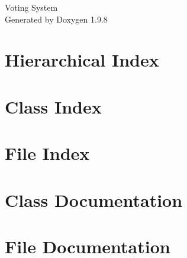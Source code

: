 \documentclass[twoside]{book}
\newcommand{\+}{\discretionary{\mbox{\scriptsize$\hookleftarrow$}}{}{}}
\newcommand{\clearemptydoublepage}{%
    \newpage{\pagestyle{empty}\cleardoublepage}%
  }
\begin{document}
  \raggedbottom
    \hypersetup{pageanchor=false,
                bookmarksnumbered=true,
                pdfencoding=unicode
               }
  \begin{titlepage}
  \vspace*{7cm}
  \begin{center}%
  {\Large Voting System}\\
  \vspace*{1cm}
  {\large Generated by Doxygen 1.9.8}\\
  \end{center}
  \end{titlepage}
  \clearemptydoublepage
  \tableofcontents
  \clearemptydoublepage
  \hypersetup{pageanchor=true}
\chapter{Hierarchical Index}

\chapter{Class Index}

\chapter{File Index}

\chapter{Class Documentation}








\chapter{File Documentation}









  \backmatter
  \newpage
  \clearemptydoublepage
  \printindex
\end{document}
